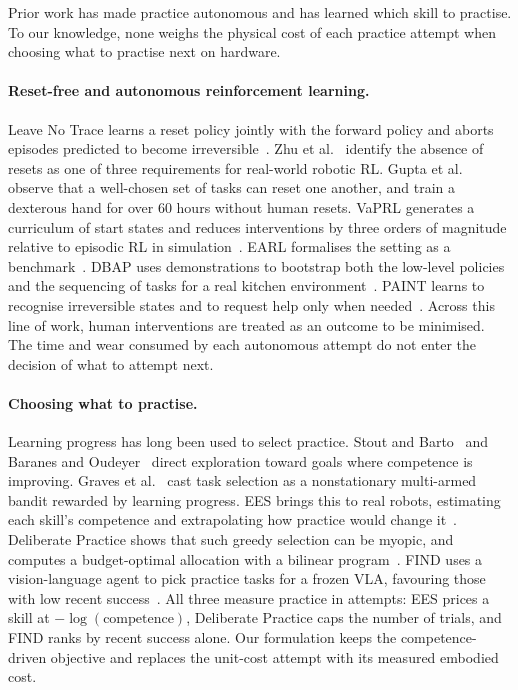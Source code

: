 \documentclass[runningheads]{llncs}
\begin{document}
Prior work has made practice autonomous and has learned which skill to practise. To our knowledge, none weighs the physical cost of each practice attempt when choosing what to practise next on hardware.

\paragraph{Reset-free and autonomous reinforcement learning.}
Leave No Trace learns a reset policy jointly with the forward policy and aborts episodes predicted to become irreversible~\cite{eysenbach2018}. Zhu et al.~\cite{zhu2020} identify the absence of resets as one of three requirements for real-world robotic RL. Gupta et al.~\cite{gupta2021} observe that a well-chosen set of tasks can reset one another, and train a dexterous hand for over 60 hours without human resets. VaPRL generates a curriculum of start states and reduces interventions by three orders of magnitude relative to episodic RL in simulation~\cite{sharma2021}. EARL formalises the setting as a benchmark~\cite{sharma2022}. DBAP uses demonstrations to bootstrap both the low-level policies and the sequencing of tasks for a real kitchen environment~\cite{gupta2023}. PAINT learns to recognise irreversible states and to request help only when needed~\cite{xie2022}. Across this line of work, human interventions are treated as an outcome to be minimised. The time and wear consumed by each autonomous attempt do not enter the decision of what to attempt next.

\paragraph{Choosing what to practise.}
Learning progress has long been used to select practice. Stout and Barto~\cite{stout2010} and Baranes and Oudeyer~\cite{baranes2013} direct exploration toward goals where competence is improving. Graves et al.~\cite{graves2017} cast task selection as a nonstationary multi-armed bandit rewarded by learning progress. EES brings this to real robots, estimating each skill's competence and extrapolating how practice would change it~\cite{kumar2024}. Deliberate Practice shows that such greedy selection can be myopic, and computes a budget-optimal allocation with a bilinear program~\cite{vats2026}. FIND uses a vision-language agent to pick practice tasks for a frozen VLA, favouring those with low recent success~\cite{fang2026}. All three measure practice in attempts: EES prices a skill at $-\log(\text{competence})$, Deliberate Practice caps the number of trials, and FIND ranks by recent success alone. Our formulation keeps the competence-driven objective and replaces the unit-cost attempt with its measured embodied cost.
\end{document}
